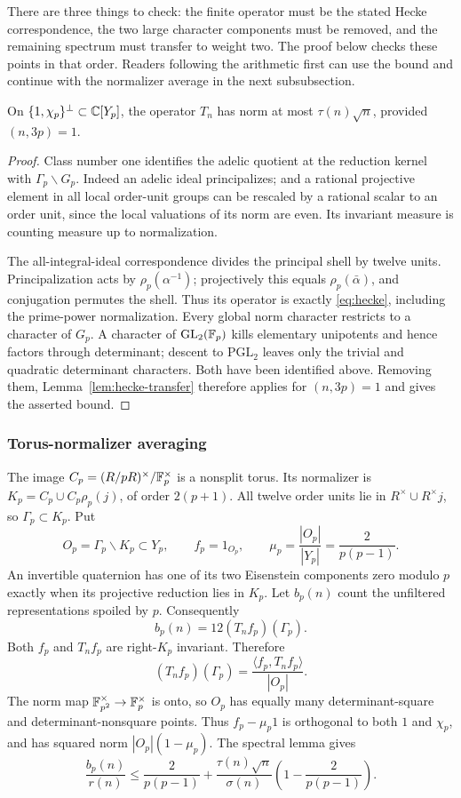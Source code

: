 There are three things to check: the finite operator must be the stated
Hecke correspondence, the two large character components must be removed,
and the remaining spectrum must transfer to weight two. The proof below
checks these points in that order. Readers following the arithmetic first
can use the bound and continue with the normalizer average in the next
subsubsection.

\begin{lemma}\label{lem:spectral}
On $\{1,\chi_p\}^\perp\subset\mathbb C[Y_p]$, the operator $T_n$ has norm at most
$\tau(n)\sqrt n$, provided $(n,3p)=1$.
\end{lemma}
\begin{proof}
Class number one identifies the adelic quotient at the reduction kernel
with $\Gamma_p\backslash G_p$.  Indeed an adelic ideal principalizes;
and a rational projective element in all local order-unit groups can
be rescaled by a rational scalar to an order unit, since the local
valuations of its norm are even.  Its invariant measure is counting
measure up to normalization.

The all-integral-ideal correspondence divides the principal shell by
twelve units.  Principalization acts by $\rho_p(\alpha^{-1})$;
projectively this equals $\rho_p(\bar\alpha)$, and conjugation
permutes the shell.  Thus its operator is exactly \eqref{eq:hecke},
including the prime-power normalization.  Every global norm character
restricts to a character of $G_p$.  A character of
$\mathrm{GL}_2(\mathbb F_p)$ kills elementary unipotents and hence factors
through determinant; descent to $\mathrm{PGL}_2$ leaves only the
trivial and quadratic determinant characters.  Both have been
identified above.  Removing them, Lemma~\ref{lem:hecke-transfer}
therefore applies for $(n,3p)=1$ and gives the asserted bound.
\end{proof}

\subsubsection{Torus-normalizer averaging}
The image $C_p=(R/pR)^\times/\mathbb F_p^\times$ is a nonsplit torus. Its
normalizer is $K_p=C_p\cup C_p\rho_p(j)$, of order $2(p+1)$.
All twelve order units lie in $R^\times\cup R^\times j$, so
$\Gamma_p\subset K_p$. Put
\[
O_p=\Gamma_p\backslash K_p\subset Y_p,\qquad f_p=1_{O_p},\qquad
\mu_p=\frac{|O_p|}{|Y_p|}=\frac2{p(p-1)}.
\]
An invertible quaternion has one of its two Eisenstein components zero
modulo $p$ exactly when its projective reduction lies in $K_p$.
Let $b_p(n)$ count the unfiltered representations spoiled by $p$. Consequently
\[
b_p(n)=12(T_nf_p)(\Gamma_p).
\]
Both $f_p$ and $T_nf_p$ are right-$K_p$ invariant. Therefore
\[
(T_nf_p)(\Gamma_p)=\frac{\langle f_p,T_nf_p\rangle}{|O_p|}.
\]
The norm map $\mathbb F_{p^2}^\times\to\mathbb F_p^\times$ is onto, so $O_p$ has
equally many determinant-square and determinant-nonsquare points.
Thus $f_p-\mu_p1$ is orthogonal to both $1$ and $\chi_p$, and has
squared norm $|O_p|(1-\mu_p)$. The spectral lemma gives
\begin{equation}\label{eq:local}
\frac{b_p(n)}{r(n)}
\le\frac2{p(p-1)}+
\frac{\tau(n)\sqrt n}{\sigma(n)}
\left(1-\frac2{p(p-1)}\right).
\end{equation}
